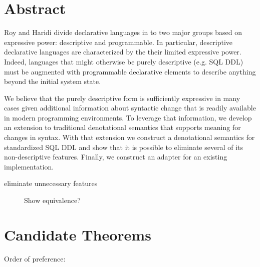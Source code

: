\documentclass[12pt]{article}
\begin{document}
\section{Abstract}

Roy and Haridi \cite{RoyH2004} divide declarative languages in to two major groups based on expressive power: descriptive and programmable. In particular, descriptive declarative languages are characterized by the their limited expressive power. Indeed, languages that might otherwise be purely descriptive (e.g. SQL DDL) must be augmented with programmable declarative elements to describe anything beyond the initial system state.

We believe that the purely descriptive form is sufficiently expressive in many cases given additional information about syntactic change that is readily available in modern programming environments. To leverage that information, we develop an extension to traditional denotational semantics that supports meaning for changes in syntax. With that extension we construct a denotational semantics for standardized SQL DDL and show that it is possible to eliminate several of its non-descriptive features. Finally, we construct an adapter for an existing implementation.

\begin{description}
  \item[eliminate unnecessary features] Show equivalence?
\end{description}

\section{Candidate Theorems}
\label{sec:theorems}

Order of preference:
\end{document}
